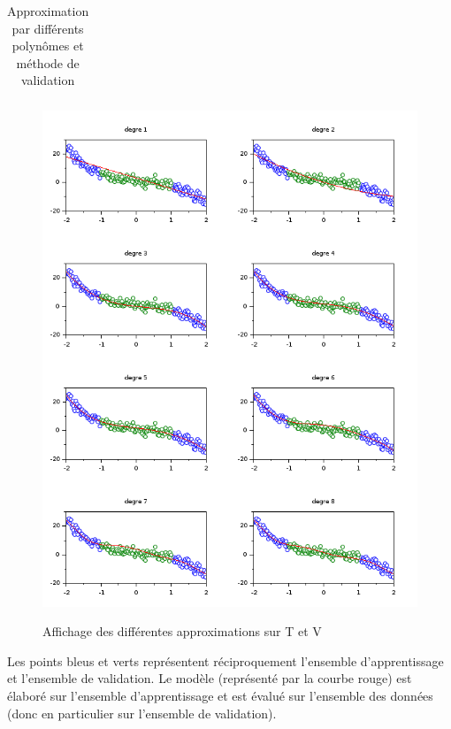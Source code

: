 \documentclass[a4paper,10pt]{report}
\begin{document}
\begin{table}[H]
\caption{Approximation par différents polynômes et méthode de validation}
\begin{tabular}{l}

\label{code_validation}
\end{tabular}
\end{table}

\begin{figure}[H]
\centering
\caption{Affichage des différentes approximations sur T et V}
\includegraphics[width=\textwidth]{validation_poly.png}
\label{graph_validation_poly}
\end{figure}

Les points bleus et verts représentent réciproquement l'ensemble d'apprentissage et l'ensemble de validation. Le modèle (représenté par la courbe rouge) est élaboré sur l'ensemble d'apprentissage et est évalué sur l'ensemble des données (donc en particulier sur l'ensemble de validation).
\end{document}
